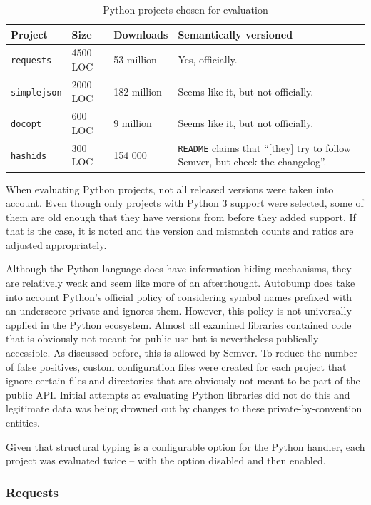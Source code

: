 \documentclass{l4proj}
\newcommand\genericstyle{\lstset{basicstyle=\ttm}}
\newcommand\codeinline[1]{{\genericstyle\lstinline!#1!}}
\begin{document}
\begin{table}[H]
\centering
\caption{Python projects chosen for evaluation}
\label{PythonProjectsForEvaluation}
\begin{tabular}{|l|l|l|p{10cm}|}
\hline
\textbf{Project} & \textbf{Size} & \textbf{Downloads}
& \textbf{Semantically versioned} \\
\hline
\codeinline{requests} & 4500 LOC & 53 million & Yes, officially. \\
\codeinline{simplejson} & 2000 LOC & 182 million
& Seems like it, but not officially. \\
\codeinline{docopt} & 600 LOC & 9 million & Seems like it, but not
officially. \\
\codeinline{hashids} & 300 LOC & 154 000 & \codeinline{README} claims
that ``[they] try to follow Semver, but check the changelog''. \\
\hline
\end{tabular}
\end{table}

When evaluating Python projects, not all released versions were taken
into account. Even though only projects with Python 3 support were
selected, some of them are old enough that they have versions from
before they added support. If that is the case, it is noted and the
version and mismatch counts and ratios are adjusted appropriately.

Although the Python language does have information hiding mechanisms,
they are relatively weak and seem like more of an afterthought.
Autobump does take into account Python's official policy of
considering symbol names prefixed with an underscore private and
ignores them. However, this policy is not
universally applied in the Python ecosystem. Almost all examined
libraries contained code that is obviously not meant for public use
but is nevertheless publically accessible. As discussed before, this
is allowed by Semver. To reduce
the number of false positives, custom configuration files were created
for each project that ignore certain files and directories that are
obviously not meant to be part of the public API. Initial attempts at
evaluating Python libraries did not do this and legitimate data was
being drowned out by changes to these private-by-convention entities.

Given that structural typing is a configurable option for the Python
handler, each project was evaluated twice -- with the option disabled
and then enabled.

\subsubsection{Requests}
\end{document}
